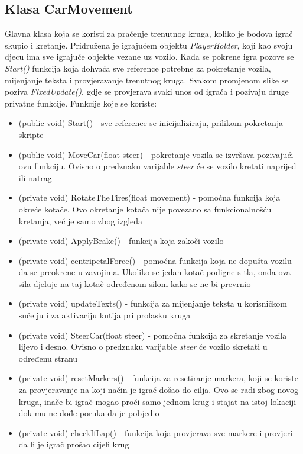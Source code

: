\subsection{Klasa CarMovement}
Glavna klasa koja se koristi za praćenje trenutnog kruga, koliko je bodova igrač skupio i kretanje. Pridružena je igrajućem objektu \emph{PlayerHolder}, koji kao svoju djecu ima sve igrajuće objekte vezane uz vozilo. Kada se pokrene igra pozove se \emph{Start()} funkcija koja dohvaća sve reference potrebne za pokretanje vozila, mijenjanje teksta i provjeravanje trenutnog kruga. Svakom promjenom slike se poziva \emph{FixedUpdate()}, gdje se provjerava svaki unos od igrača i pozivaju druge privatne funkcije. Funkcije koje se koriste:
\begin{itemize}
	\item (public void) Start() - sve reference se inicijaliziraju, prilikom pokretanja skripte
	\item (public void) MoveCar(float steer) - pokretanje vozila se izvršava pozivajući ovu funkciju. Ovisno o predznaku varijable \emph{steer} će se vozilo kretati naprijed ili natrag
	\item (private void) RotateTheTires(float movement) - pomoćna funkcija koja okreće kotače. Ovo okretanje kotača nije povezano sa funkcionalnošću kretanja, već je samo zbog izgleda
	\item (private void) ApplyBrake() - funkcija koja zakoči vozilo
	\item (private void) centripetalForce() - pomoćna funkcija koja ne dopušta vozilu da se preokrene u zavojima. Ukoliko se jedan kotač podigne s tla, onda ova sila djeluje na taj kotač određenom silom kako se ne bi prevrnio
	\item (private void) updateTexts() - funkcija za mijenjanje teksta u korisničkom sučelju i za aktivaciju kutija pri prolasku kruga
	\item (private void) SteerCar(float steer) - pomoćna funkcija za skretanje vozila lijevo i desno. Ovisno o predznaku varijable \emph{steer} će vozilo skretati u određenu stranu
	\item (private void) resetMarkers() - funkcija za resetiranje markera, koji se koriste za provjeravanje na koji način je igrač došao do cilja. Ovo se radi zbog novog kruga, inače bi igrač mogao proći samo jednom krug i stajat na istoj lokaciji dok mu ne dođe poruka da je pobjedio
	\item (private void) checkIfLap() - funkcija koja provjerava sve markere i provjeri da li je igrač prošao cijeli krug

\end{itemize}
